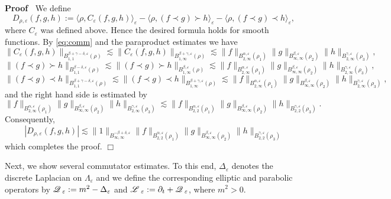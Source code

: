\documentclass[a4paper,11pt]{article}
\newcommand{\assign}{:=}
\newenvironment{proof}{\noindent\textbf{Proof\ }}{\hspace*{\fill}$\Box$\medskip}
\numberwithin{equation}{section}
\newcommand{\LL}{\mathscr{L} \hspace{.2em}}
\newcommand{\Q}{\mathscr{Q} \hspace{.2em}}
\begin{document}
\begin{proof}
  We define
  \[ D_{\rho, \varepsilon} (f, g, h) \assign \langle \rho, C_{\varepsilon} (f,
     g, h) \rangle_{\varepsilon} - \langle \rho, (f \prec g) \succ h
     \rangle_{\varepsilon} - \langle \rho, (f \prec g) \prec h
     \rangle_{\varepsilon}, \]
  where $C_{\varepsilon}$ was defined above. Hence the desired formula holds
  for smooth functions. By {\eqref{eq:comm}} and the paraproduct estimates we
  have
  \[ \| C_{\varepsilon} (f, g, h) \|_{B^{\beta + \gamma - \delta,
     \varepsilon}_{1, 1} (\rho)} \lesssim \| C_{\varepsilon} (f, g, h)
     \|_{B^{\beta + \gamma, \varepsilon}_{1, \infty} (\rho)} \lesssim \| f
     \|_{B^{\alpha, \varepsilon}_{2, \infty} (\rho_1)} \| g \|_{B^{\beta,
     \varepsilon}_{\infty, \infty} (\rho_2)} \| h \|_{B^{\gamma,
     \varepsilon}_{2, \infty} (\rho_3)}, \]
  \[ \| (f \prec g) \succ h \|_{B^{\beta - \delta, \varepsilon}_{1, 1} (\rho)}
     \lesssim \| (f \prec g) \succ h \|_{B^{\beta, \varepsilon}_{1, \infty}
     (\rho)} \lesssim \| f \|_{B^{\alpha, \varepsilon}_{2, \infty} (\rho_1)}
     \| g \|_{B^{\beta, \varepsilon}_{\infty, \infty} (\rho_2)} \| h
     \|_{B^{\gamma, \varepsilon}_{2, \infty} (\rho_3)}, \]
  \[ \| (f \prec g) \prec h \|_{B^{\beta + \gamma - \delta, \varepsilon}_{1,
     1} (\rho)} \lesssim \| (f \prec g) \prec h \|_{B^{\beta + \gamma,
     \varepsilon}_{1, \infty} (\rho)} \lesssim \| f \|_{B^{\alpha,
     \varepsilon}_{2, \infty} (\rho_1)} \| g \|_{B^{\beta,
     \varepsilon}_{\infty, \infty} (\rho_2)} \| h \|_{B^{\gamma,
     \varepsilon}_{2, \infty} (\rho_3)}, \]
  and the right hand side is estimated by
  \[ \| f \|_{B^{\alpha, \varepsilon}_{2, \infty} (\rho_1)} \| g \|_{B^{\beta,
     \varepsilon}_{\infty, \infty} (\rho_2)} \| h \|_{B^{\gamma,
     \varepsilon}_{2, \infty} (\rho_3)} \lesssim \| f \|_{B^{\alpha,
     \varepsilon}_{2, 2} (\rho_1)} \| g \|_{B^{\beta, \varepsilon}_{\infty,
     \infty} (\rho_2)} \| h \|_{B^{\gamma, \varepsilon}_{2, 2} (\rho_3)} . \]
  Consequently,
  \[ | D_{\rho, \varepsilon} (f, g, h) | \lesssim \| 1 \|_{B^{- \beta +
     \delta, \varepsilon}_{\infty, \infty}} \| f \|_{B^{\alpha,
     \varepsilon}_{2, 2} (\rho_1)} \| g \|_{B^{\beta, \varepsilon}_{\infty,
     \infty} (\rho_2)} \| h \|_{B^{\gamma, \varepsilon}_{2, 2} (\rho_3)} \]
  which completes the proof.
  \end{proof}


Next, we show several commutator estimates. To this end, $\Delta_{\varepsilon}$ denotes the discrete
Laplacian on $\Lambda_{\varepsilon}$ and we define the corresponding elliptic
and parabolic operators by $\Q_{\varepsilon} \assign m^{2} -
\Delta_{\varepsilon}$ and $\LL_{\varepsilon} \assign \partial_t +
\Q_{\varepsilon}$, where $m^{2} > 0$.
\end{document}
